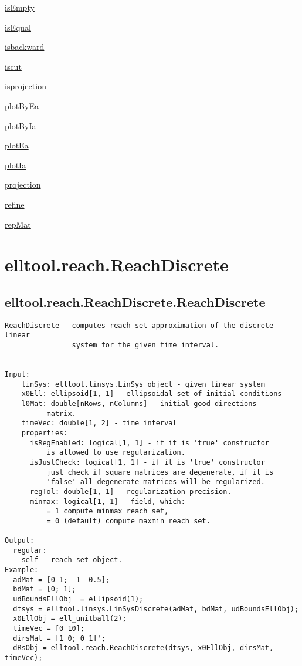 \begin{list}{}{}
 \item \hyperref[method:elltool.reach.AReach.isEmpty]{isEmpty}
 \item \hyperref[method:elltool.reach.AReach.isEqual]{isEqual}
 \item \hyperref[method:elltool.reach.AReach.isbackward]{isbackward}
 \item \hyperref[method:elltool.reach.AReach.iscut]{iscut}
 \item \hyperref[method:elltool.reach.AReach.isprojection]{isprojection}
 \item \hyperref[method:elltool.reach.AReach.plotByEa]{plotByEa}
 \item \hyperref[method:elltool.reach.AReach.plotByIa]{plotByIa}
 \item \hyperref[method:elltool.reach.AReach.plotEa]{plotEa}
 \item \hyperref[method:elltool.reach.AReach.plotIa]{plotIa}
 \item \hyperref[method:elltool.reach.AReach.projection]{projection}
 \item \hyperref[method:elltool.reach.AReach.refine]{refine}
 \item \hyperref[method:elltool.reach.AReach.repMat]{repMat}
\end{list}
\section{elltool.reach.ReachDiscrete}\label{secClassDescr:elltool.reach.ReachDiscrete}
\subsection{\texorpdfstring{elltool.reach.ReachDiscrete.ReachDiscrete}{ReachDiscrete}}\label{method:elltool.reach.ReachDiscrete.ReachDiscrete}
\begin{verbatim}
ReachDiscrete - computes reach set approximation of the discrete linear
                system for the given time interval.


Input:
    linSys: elltool.linsys.LinSys object - given linear system
    x0Ell: ellipsoid[1, 1] - ellipsoidal set of initial conditions
    l0Mat: double[nRows, nColumns] - initial good directions
          matrix.
    timeVec: double[1, 2] - time interval
    properties:
      isRegEnabled: logical[1, 1] - if it is 'true' constructor
          is allowed to use regularization.
      isJustCheck: logical[1, 1] - if it is 'true' constructor
          just check if square matrices are degenerate, if it is
          'false' all degenerate matrices will be regularized.
      regTol: double[1, 1] - regularization precision.
      minmax: logical[1, 1] - field, which:
          = 1 compute minmax reach set,
          = 0 (default) compute maxmin reach set.

Output:
  regular:
    self - reach set object.
Example:
  adMat = [0 1; -1 -0.5];
  bdMat = [0; 1];
  udBoundsEllObj  = ellipsoid(1);
  dtsys = elltool.linsys.LinSysDiscrete(adMat, bdMat, udBoundsEllObj);
  x0EllObj = ell_unitball(2);
  timeVec = [0 10];
  dirsMat = [1 0; 0 1]';
  dRsObj = elltool.reach.ReachDiscrete(dtsys, x0EllObj, dirsMat, timeVec);
\end{verbatim}


